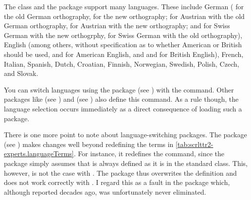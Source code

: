 The  class and the  package support many
languages. These include German ( for
the old German orthography,  for the new orthography;
 for Austrian with the old German orthography,
 for Austrian with the
new orthography; and 
for Swiss German with the new orthogrphy,  for Swiss
German with the old orthography), English (among
others,  without specification as to whether American or
British should be used,  and  for American
English, and  and  for British English),
French, Italian,
Spanish, Dutch,
Croatian, Finnish,
Norwegian,
Swedish,
Polish,
Czech, and Slovak.

You can switch languages using the  package
(see \cite{package:babel}) with the 
command.  Other packages like  (see
\cite{package:german}) and  (see
\cite{package:ngerman}) also define this command.  As a rule though, the
language selection occurs immediately as a direct consequence of loading such
a package.
\iffalse%
For details, please refer to the documentation of the relevant packages.
\fi

There is one more point to note about language-switching
packages. The
 package (see
\cite{package:french}) makes changes well beyond redefining the terms in
\autoref{tab:scrlttr2-experts.languageTerms}. For instance, it redefines the
 command, since the package simply assumes that
 is always defined as it is in the standard
 class. This, however, is not the case with \KOMAScript{}. The
 package thus overwrites the definition and does not work
correctly with \KOMAScript. I regard this as a fault in the 
package which, although reported decades ago, was unfortunately never
eliminated.

